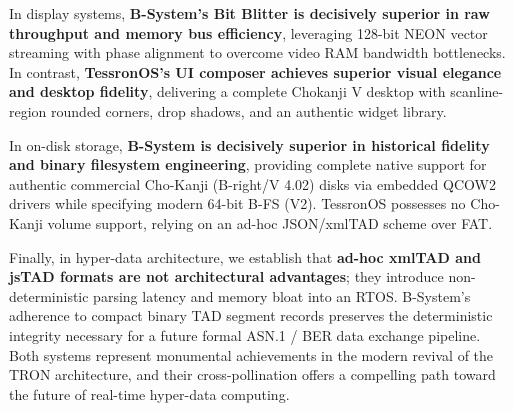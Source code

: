\documentclass[10pt,journal,compsoc,twocolumn]{article}
\begin{document}
In display systems, \textbf{B-System's Bit Blitter is decisively superior in raw throughput and memory bus efficiency}, leveraging 128-bit NEON vector streaming with phase alignment to overcome video RAM bandwidth bottlenecks. In contrast, \textbf{TessronOS's UI composer achieves superior visual elegance and desktop fidelity}, delivering a complete Chokanji V desktop with scanline-region rounded corners, drop shadows, and an authentic widget library.

In on-disk storage, \textbf{B-System is decisively superior in historical fidelity and binary filesystem engineering}, providing complete native support for authentic commercial Cho-Kanji (B-right/V 4.02) disks via embedded QCOW2 drivers while specifying modern 64-bit B-FS (V2). TessronOS possesses no Cho-Kanji volume support, relying on an ad-hoc JSON/xmlTAD scheme over FAT.

Finally, in hyper-data architecture, we establish that \textbf{ad-hoc xmlTAD and jsTAD formats are not architectural advantages}; they introduce non-deterministic parsing latency and memory bloat into an RTOS. B-System's adherence to compact binary TAD segment records preserves the deterministic integrity necessary for a future formal ASN.1 / BER data exchange pipeline. Both systems represent monumental achievements in the modern revival of the TRON architecture, and their cross-pollination offers a compelling path toward the future of real-time hyper-data computing.
\end{document}
